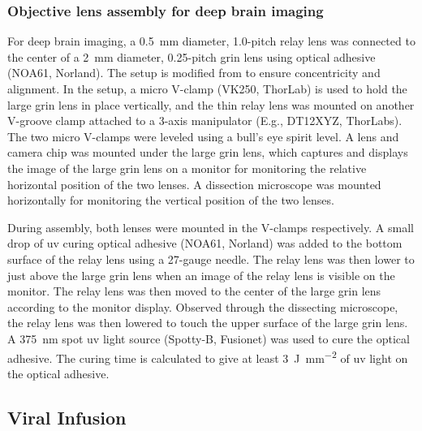 \subsubsection{Objective lens assembly for deep brain imaging} \label{objective assembly}

For deep brain imaging, a \SI{0.5}{\mm} diameter, 1.0-pitch relay lens was connected to the center of a \SI{2}{\mm} diameter, 0.25-pitch \gls{grin} lens using optical adhesive (NOA61, Norland). The setup is modified from \citep{kim12} to ensure concentricity and alignment. In the setup, a micro V-clamp (VK250, ThorLab) is used to hold the large \gls{grin} lens in place vertically, and the thin relay lens was mounted on another V-groove clamp attached to a 3-axis manipulator (E.g., DT12XYZ, ThorLabs). The two micro V-clamps were leveled using a bull's eye spirit level. A lens and camera chip was mounted under the large \gls{grin} lens, which captures and displays the image of the large \gls{grin} lens on a monitor for monitoring the relative horizontal position of the two lenses. A dissection microscope was mounted horizontally for monitoring the vertical position of the two lenses. 

During assembly, both lenses were mounted in the V-clamps respectively. A small drop of \gls{uv} curing optical adhesive (NOA61, Norland) was added to the bottom surface of the relay lens using a 27-gauge needle. The relay lens was then lower to just above the large \gls{grin} lens when an image of the relay lens is visible on the monitor. The relay lens was then moved to the center of the large \gls{grin} lens according to the monitor display. Observed through the dissecting microscope, the relay lens was then lowered to touch the upper surface of the large \gls{grin} lens. A \SI{375}{\nm} spot \gls{uv} light source (Spotty-B, Fusionet) was used to cure the optical adhesive. The curing time is calculated to give at least \SI{3}{\J\per\mm\squared} of \gls{uv} light on the optical adhesive. 

\subsection{Viral Infusion \label{viral-infusion}}

